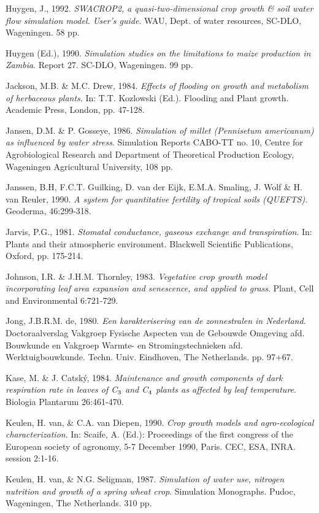 Huygen, J., 1992. {\it SWACROP2, a quasi-two-dimensional crop growth \& soil water flow simulation
model. User's guide\/}. WAU, Dept. of water resources, SC-DLO, Wageningen. 58 pp.

Huygen (Ed.), 1990. {\it Simulation studies on the limitations to maize production in Zambia\/}. Report 27.
SC-DLO, {\nobreak}Wageningen. 99 pp.

Jackson, M.B. \& M.C. Drew, 1984. {\it Effects of flooding on growth and metabolism of herbaceous
plants\/}. In: T.T. Kozlowski (Ed.). Flooding and Plant growth. Academic Press, London, pp. 47-128.

Jansen, D.M. \& P. Gosseye, 1986. {\it Simulation of millet (Pennisetum americanum) as influenced by
water stress\/}. Simulation Reports CABO-TT no. 10, Centre for Agrobiological Research and
Department of Theoretical Production Ecology, Wageningen Agricultural University, 108 pp.

Janssen, B.H, F.C.T. Guilking, D. van der Eijk, E.M.A. Smaling, J. Wolf \& H. van Reuler, 1990.
{\it A system for quantitative fertility of tropical soils (QUEFTS)\/}. Geoderma, 46:299-318.

Jarvis, P.G., 1981. {\it Stomatal conductance, gaseous exchange and transpiration\/}. In: Plants and their
atmospheric environment. Blackwell Scientific Publications, Oxford, pp. 175-214.

Johnson, I.R. \& J.H.M. Thornley, 1983. {\it Vegetative crop growth model incorporating leaf area
expansion and senescence, and applied to grass\/}. Plant, Cell and Environmental 6:721-729.

Jong, J.B.R.M. de, 1980. {\it Een karakterisering van de zonnestralen in Nederland\/}. Doctoraalverslag
Vakgroep Fysische Aspecten van de Gebouwde Omgeving afd. Bouwkunde en Vakgroep Warmte-
en Stromingstechnieken afd. Werktuigbouwkunde. Techn. Univ. Eindhoven, The Netherlands. pp.
97+67.

Kase, M. \& J. Catsk\'{y}, 1984. {\it Maintenance and growth components of dark respiration rate in leaves
of C$_{{\rm 3}}$ and C$_{{\rm 4}}$ plants as affected by leaf temperature\/}. Biologia Plantarum 26:461-470.

Keulen, H. van, \& C.A. van Diepen, 1990. {\it Crop growth models and agro-ecological charac\-terizati\-on\/}. 
In: Scaife, A. (Ed.): Proceedings of the first con\-gress of the European so\-cie\-ty of agronomy, 5-7
December 1990, Paris. CEC, ESA, INRA. session 2:1-16.

Keulen, H. van, \& N.G. Seligman, 1987. {\it Simulation of water use, nitrogen nutrition and growth of
a spring wheat crop\/}. Simulation Monographs. Pudoc, Wageningen, The Netherlands. 310 pp.

